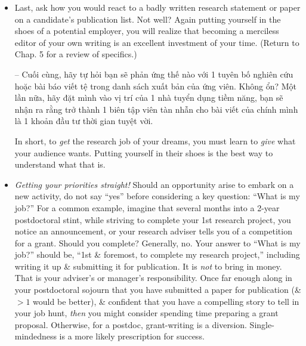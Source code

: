 \documentclass{article}
\begin{document}
\begin{enumerate}
\begin{itemize}
\begin{itemize}
			Ask yourself next, ``How would I react to a poorly prepared interview talk? If the slides were cluttered \& confusing, if the arguments were unconvincing, or worse, would I be excited about hiring the speaker?'' The obvious answer is ample impetus to make your oral presentations, all of them, engaging, informative, \& persuasive. (Return to Chap. 4 for details.)

			-- Tiếp theo, hãy tự hỏi, ``Tôi sẽ phản ứng thế nào với 1 bài phát biểu phỏng vấn được chuẩn bị kém? Nếu các slide lộn xộn \& khó hiểu, nếu các lập luận không thuyết phục, hoặc tệ hơn, liệu tôi có hào hứng thuê diễn giả không?'' Câu trả lời rõ ràng là động lực dồi dào để khiến bài thuyết trình của bạn, tất cả đều hấp dẫn, nhiều thông tin, \& thuyết phục.
			\item Last, ask how you would react to a badly written research statement or paper on a candidate's publication list. Not well? Again putting yourself in the shoes of a potential employer, you will realize that becoming a merciless editor of your own writing is an excellent investment of your time. (Return to Chap. 5 for a review of specifics.)

			-- Cuối cùng, hãy tự hỏi bạn sẽ phản ứng thế nào với 1 tuyên bố nghiên cứu hoặc bài báo viết tệ trong danh sách xuất bản của ứng viên. Không ổn? Một lần nữa, hãy đặt mình vào vị trí của 1 nhà tuyển dụng tiềm năng, bạn sẽ nhận ra rằng trở thành 1 biên tập viên tàn nhẫn cho bài viết của chính mình là 1 khoản đầu tư thời gian tuyệt vời.

			In short, to {\it get} the research job of your dreams, you must learn to {\it give} what your audience wants. Putting yourself in their shoes is the best way to understand what that is.
			\item {\it Getting your priorities straight!} Should an opportunity arise to embark on a new activity, do not say ``yes'' before considering a key question: ``What is my job?'' For a common example, imagine that several months into a 2-year postdoctoral stint, while striving to complete your 1st research project, you notice an announcement, or your research adviser tells you of a competition for a grant. Should you complete? Generally, no. Your answer to ``What is my job?'' should be, ``1st \& foremost, to complete my research project,'' including writing it up \& submitting it for publication. It is {\it not} to bring in money. That is your adviser's or manager's responsibility. Once far enough along in your postdoctoral sojourn that you have submitted a paper for publication (\& $> 1$ would be better), \& confident that you have a compelling story to tell in your job hunt, {\it then} you might consider spending time preparing a grant proposal. Otherwise, for a postdoc, grant-writing is a diversion. Single-mindedness is a more likely prescription for success.


\end{itemize}
\end{itemize}
\end{enumerate}
\end{document}
